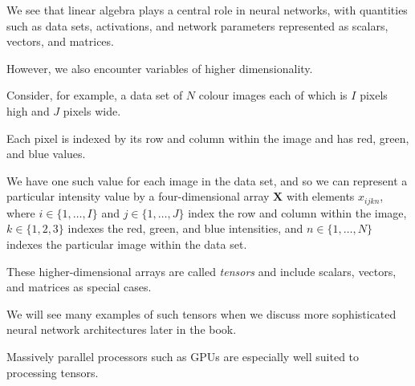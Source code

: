 \documentclass{article}
\begin{document}
We see that linear algebra plays a central role in neural networks, with quantities such as data sets, activations, and network parameters represented as scalars, vectors, and matrices. 

However, we also encounter variables of higher dimensionality. 

Consider, for example, a data set of $N$ colour images each of which is $I$ pixels high and $J$ pixels wide. 

Each pixel is indexed by its row and column within the image and has red, green, and blue values. 

We have one such value for each image in the data set, and so we can represent a particular intensity value by a four-dimensional array $\mathbf{X}$ with elements $x_{ijkn}$, where $i \in \{1,\dots,I\}$ and $j \in \{1,\dots,J\}$ index the row and column within the image, $k \in \{1,2,3\}$ indexes the red, green, and blue intensities, and $n \in \{1,\dots,N\}$ indexes the particular image within the data set. 

These higher-dimensional arrays are called \emph{tensors} and include scalars, vectors, and matrices as special cases. 

We will see many examples of such tensors when we discuss more sophisticated neural network architectures later in the book. 

Massively parallel processors such as GPUs are especially well suited to processing tensors.

{\color{red}

}
\end{document}
